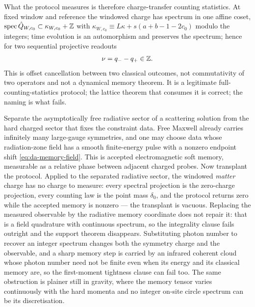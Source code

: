 What the protocol measures is therefore charge-transfer counting statistics. At
fixed window and reference the windowed charge has spectrum in one affine coset,
$\operatorname{spec}\hat{Q}_{W,c_0}\subset\kappa_{W,c_0}+\mathbb{Z}$ with
$\kappa_{W,c_0}\equiv L\kappa+s(a+b-1-2c_0)$ modulo the integers; time
evolution is an automorphism and preserves the spectrum; hence for two
sequential projective readouts
\begin{equation}
  \nu=q_--q_+\in\mathbb{Z} .
  \label{eq:da-tpm-integer}
\end{equation}
This is offset cancellation between two classical outcomes, not commutativity
of two operators and not a dynamical memory theorem. It is a legitimate
full-counting-statistics protocol; the lattice theorem that consumes it is
correct; the naming is what fails.

\begin{observation}
\label{obs:da-maxwell-counterexample}
Separate the asymptotically free radiative sector of a scattering solution from
the hard charged sector that fixes the constraint data. Free Maxwell already
carries infinitely many large-gauge symmetries, and one may choose data whose
radiation-zone field has a smooth finite-energy pulse with a nonzero endpoint
shift \eqref{eq:da-memory-field}. This is accepted electromagnetic soft memory,
measurable as a relative phase between adjacent charged probes. Now transplant
the protocol. Applied to the separated radiative sector, the windowed
\emph{matter} charge has no charge to measure: every spectral projection is the
zero-charge projection, every counting law is the point mass $\delta_0$, and the
protocol returns zero while the accepted memory is nonzero --- the transplant is
vacuous. Replacing the measured observable by the radiative memory coordinate
does not repair it: that is a field quadrature with continuous spectrum, so the
integrality clause fails outright and the support theorem disappears.
Substituting photon number to recover an integer spectrum changes both the
symmetry charge and the observable, and a sharp memory step is carried by an
infrared coherent cloud whose photon number need not be finite even when its
energy and its classical memory are, so the first-moment tightness clause can
fail too. The same obstruction is plainer still in gravity, where the memory
tensor varies continuously with the hard momenta and no integer on-site circle
spectrum can be its discretisation.
\end{observation}



